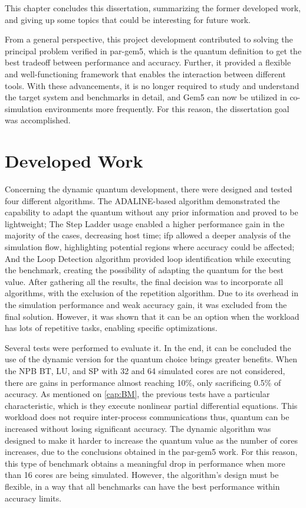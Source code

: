 

This chapter concludes this dissertation, summarizing the former developed work, and giving up some topics that could be
interesting for future work.

From a general perspective, this project development contributed to solving the principal problem verified in par-gem5, which is the 
quantum definition to get the best tradeoff between performance and accuracy. Further, it provided a flexible and well-functioning framework 
that enables the interaction between different tools. With these advancements, it is no longer required to study and understand 
the target system and benchmarks in detail, and Gem5 can now be utilized in co-simulation environments more frequently.
For this reason, the dissertation goal was accomplished. 

\section{Developed Work}

Concerning the dynamic quantum development, there were designed and tested four different algorithms. 
The ADALINE-based algorithm demonstrated the capability to adapt the quantum without any prior information and proved to be lightweight;
The Step Ladder usage enabled a higher performance gain in the majority of the cases, decreasing host time; 
\gls{ifp} allowed a deeper analysis of the simulation flow, highlighting potential regions where accuracy could be affected; And the Loop Detection 
algorithm provided loop identification while executing the benchmark, creating the possibility of adapting the quantum 
for the best value. 
After gathering all the results, the final decision was to incorporate all algorithms, with the exclusion of the repetition algorithm.
Due to its overhead in the simulation performance and weak accuracy gain, it was excluded from the final solution. However, it was shown 
that it can be an option when the workload has lots of repetitive tasks, enabling specific optimizations.

Several tests were performed to evaluate it. In the end, it can be concluded the use of the dynamic version for the quantum choice brings 
greater benefits. When the NPB BT, LU, and SP with 32 and 64 simulated cores are not considered, there are gains in performance almost 
reaching 10\%, only sacrificing 0.5\% of accuracy. As mentioned on \autoref{cap:BM}, the previous tests have a particular characteristic, 
which is they execute nonlinear partial differential equations. This workload does not require inter-process communications thus, 
quantum can be increased without losing significant accuracy. The dynamic algorithm was designed to make it harder to increase the 
quantum value as the number of cores increases, due to the conclusions obtained in the par-gem5 \cite*{pargem5} work. For this reason, 
this type of benchmark obtains a meaningful drop in performance when more than 16 cores are being simulated. However, the 
algorithm's design must be flexible, in a way that all benchmarks can have the best performance within accuracy limits.

